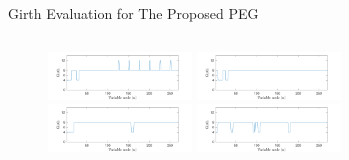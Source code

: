 \documentclass[11pt, aspectratio=169]{beamer}
\begin{document}
\begin{frame}{Girth Evaluation for The Proposed PEG}
	\vspace{-1cm}

	\begin{columns}
		\hspace{0.5cm}
		\begin{column}{0.5\textwidth}
			
		\begin{figure}[tb]
			\centering
			\begin{minipage}{.5\linewidth}
				\includegraphics[width=1.5in]{gambarafa/girth/girthds4-9.pdf}
			\end{minipage}
			\hfill
				\hspace{-0.8 cm}
			\begin{minipage}{.5\linewidth}
								\hspace{-0.225 cm}
				\includegraphics[width=1.5in]{gambarafa/girth/girthds3-5.pdf}
			\end{minipage}
			\begin{minipage}{.5\linewidth}
				\includegraphics[width=1.5in]{gambarafa/girth/girthds2-3.pdf}
			\end{minipage}
			\hfill
				\hspace{-0.8 cm}
			\begin{minipage}{.5\linewidth}
								\hspace{-0.225 cm}
				\includegraphics[width=1.5in]{gambarafa/girth/girthds3-4.pdf}

\end{minipage}
\end{figure}
\end{column}
\end{columns}
\end{frame}
\end{document}
